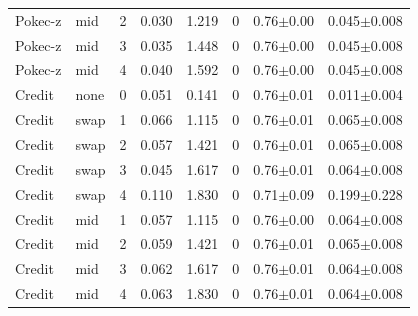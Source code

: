 \begin{table}[tbp]
\begin{tabular}{llcccccc}
Pokec-z & mid & 2 & 0.030 & 1.219 & 0 & 0.76$\pm$0.00 & 0.045$\pm$0.008 \\
Pokec-z & mid & 3 & 0.035 & 1.448 & 0 & 0.76$\pm$0.00 & 0.045$\pm$0.008 \\
Pokec-z & mid & 4 & 0.040 & 1.592 & 0 & 0.76$\pm$0.00 & 0.045$\pm$0.008 \\
Credit & none & 0 & 0.051 & 0.141 & 0 & 0.76$\pm$0.01 & 0.011$\pm$0.004 \\
Credit & swap & 1 & 0.066 & 1.115 & 0 & 0.76$\pm$0.01 & 0.065$\pm$0.008 \\
Credit & swap & 2 & 0.057 & 1.421 & 0 & 0.76$\pm$0.01 & 0.065$\pm$0.008 \\
Credit & swap & 3 & 0.045 & 1.617 & 0 & 0.76$\pm$0.01 & 0.064$\pm$0.008 \\
Credit & swap & 4 & 0.110 & 1.830 & 0 & 0.71$\pm$0.09 & 0.199$\pm$0.228 \\
Credit & mid & 1 & 0.057 & 1.115 & 0 & 0.76$\pm$0.00 & 0.064$\pm$0.008 \\
Credit & mid & 2 & 0.059 & 1.421 & 0 & 0.76$\pm$0.01 & 0.065$\pm$0.008 \\
Credit & mid & 3 & 0.062 & 1.617 & 0 & 0.76$\pm$0.01 & 0.064$\pm$0.008 \\
Credit & mid & 4 & 0.063 & 1.830 & 0 & 0.76$\pm$0.01 & 0.064$\pm$0.008 \\
\bottomrule
\end{tabular}
\end{table}
